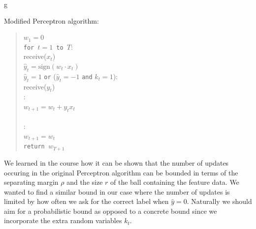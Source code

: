 g\documentclass[12pt]{article}
\begin{document}
\noindent Modified Perceptron algorithm:
\begin{quotation}
\noindent $w_1=0$\\
{\tt for $t=1$ to $T$}:\\
\indent receive($x_t$)\\
\indent $\widehat{y}_t=\mbox{sign}(w_t\cdot x_t)$\\
 $\widehat{y}_t =1$ {\tt or} ($\widehat{y}_t =-1$ {\tt and} $k_t = 1$):\\
\indent\indent receive($y_t$)\\
\indent{}:\\
\indent\indent\indent $w_{t+1} = w_t + y_t x_t$\\
\indent{}\\
:\\
\indent\indent $w_{t+1} = w_t$\\
{\tt return $w_{T+1}$}

\end{quotation}

We learned in the course how it can be shown that the number of updates occuring in the original Perceptron algorithm can be bounded in terms of the separating margin $\rho$ and the size $r$ of the ball containing the feature data. We wanted to find a similar bound in our case where the number of updates is limited by how often we ask for the correct label when $\widehat y = 0$. Naturally we should aim for a probabilistic bound as opposed to a concrete bound since we incorporate the extra random variables $k_t$.
\end{document}
